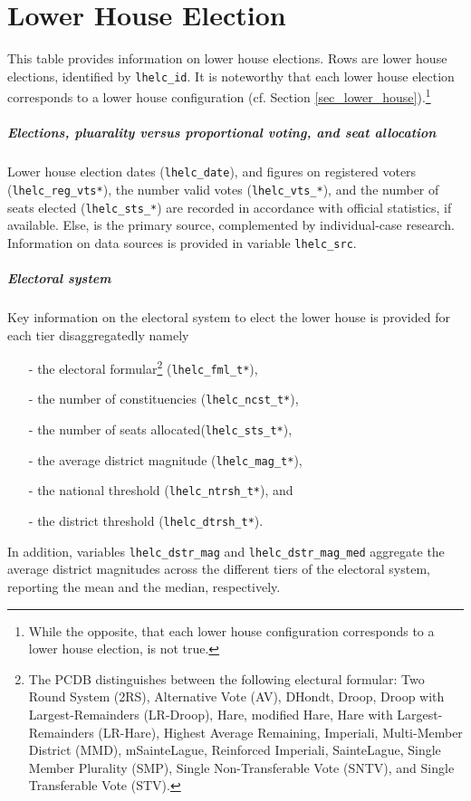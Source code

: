 \section{Lower House Election}\label{sec_lh_election}
This table provides information on lower house elections. Rows are lower house elections, identified by \texttt{\footnotesize lhelc\_id}. It is noteworthy that each lower house election corresponds to a lower house configuration (cf. Section \ref{sec_lower_house}).\footnote{While the opposite, that each lower house configuration corresponds to a lower house election, is not true.}

\subparagraph{Elections, pluarality versus proportional voting, and seat allocation}
Lower house election dates (\texttt{\footnotesize lhelc\_date}), and figures on registered voters (\texttt{\footnotesize lhelc\_reg\_vts*}), the number valid votes (\texttt{\footnotesize lhelc\_vts\_*}), and the number of seats elected (\texttt{\footnotesize lhelc\_sts\_*}) are recorded in accordance with official statistics, if available. 
Else, \citet{Nohlen2001, Nohlen2005, Nohlen2010} is the primary source, complemented by individual-case research. Information on data sources is provided in variable \texttt{\footnotesize lhelc\_src}.

\subparagraph{Electoral system}
Key information on the electoral system to elect the lower house is provided for each tier disaggregatedly namely
\begin{itemize}\itemsep-4pt 
\item[-]{the electoral formular\footnote{%
The PCDB distinguishes between the following electural formular: Two Round System (2RS), Alternative Vote (AV), DHondt, Droop, Droop with Largest-Remainders (LR-Droop), Hare, modified Hare, Hare with Largest-Remainders (LR-Hare), Highest Average Remaining, Imperiali, Multi-Member District (MMD), mSainteLague, Reinforced Imperiali, SainteLague, Single Member Plurality (SMP), Single Non-Transferable Vote (SNTV), and Single Transferable Vote (STV).%
} (\texttt{\footnotesize lhelc\_fml\_t*}),}
\item[-]{the number of constituencies (\texttt{\footnotesize lhelc\_ncst\_t*}),}
\item[-]{the number of seats allocated(\texttt{\footnotesize lhelc\_sts\_t*}),}
\item[-]{the average district magnitude (\texttt{\footnotesize lhelc\_mag\_t*}),}
\item[-]{the national threshold (\texttt{\footnotesize lhelc\_ntrsh\_t*}), and}
\item[-]{the district threshold (\texttt{\footnotesize lhelc\_dtrsh\_t*}).}
\end{itemize}
In addition, 
variables \texttt{\footnotesize lhelc\_dstr\_mag} and \texttt{\footnotesize lhelc\_dstr\_mag\_med} aggregate the average district magnitudes across the different tiers of the electoral system, reporting the mean and the median, respectively.

